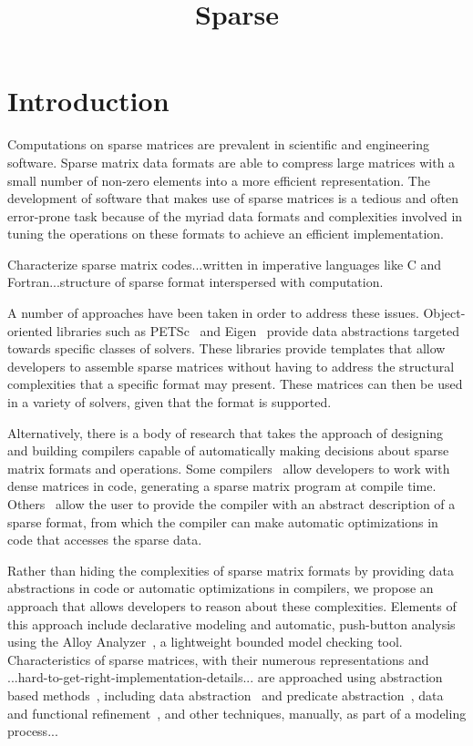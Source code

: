 \documentclass[11pt,conference]{IEEEtran}
\begin{document}
\title{Sparse}
\author{
  \and
}

\maketitle

\section{Introduction}

Computations on sparse matrices are prevalent in scientific and engineering software.  Sparse matrix data formats are able to compress large matrices with a small number of non-zero elements into a more efficient representation.  The development of software that makes use of sparse matrices is a tedious and often error-prone task because of the myriad data formats and complexities involved in tuning the operations on these formats to achieve an efficient implementation.

Characterize sparse matrix codes...written in imperative languages like C and Fortran...structure of sparse format interspersed with computation.  

A number of approaches have been taken in order to address these issues.  Object-oriented libraries such as PETSc~\cite{petsc2019} and Eigen~\cite{eigenweb2010} provide data abstractions targeted towards specific classes of solvers.  These libraries provide templates that allow developers to assemble sparse matrices without having to address the structural complexities that a specific format may present.  These matrices can then be used in a variety of solvers, given that the format is supported.

Alternatively, there is a body of research that takes the approach of designing and building compilers capable of automatically making decisions about sparse matrix formats and operations.  Some compilers~\cite{bik1995, bik1996} allow developers to work with dense matrices in code, generating a sparse matrix program at compile time.  Others~\cite{kotlyar1997} allow the user to provide the compiler with an abstract description of a sparse format, from which the compiler can make automatic optimizations in code that accesses the sparse data.

Rather than hiding the complexities of sparse matrix formats by providing data abstractions in code or automatic optimizations in compilers, we propose an approach that allows developers to reason about these complexities.  Elements of this approach include declarative modeling and automatic, push-button analysis using the Alloy Analyzer~\cite{jackson2012}, a lightweight bounded model checking tool.  Characteristics of sparse matrices, with their numerous representations and ...hard-to-get-right-implementation-details... are approached using abstraction based methods~\cite{clarke1994}, including data abstraction~\cite{dingel1995} and predicate abstraction~\cite{graf1997}, data and functional refinement~\cite{woodcock1996}, and other techniques, manually, as part of a modeling process...
\end{document}
